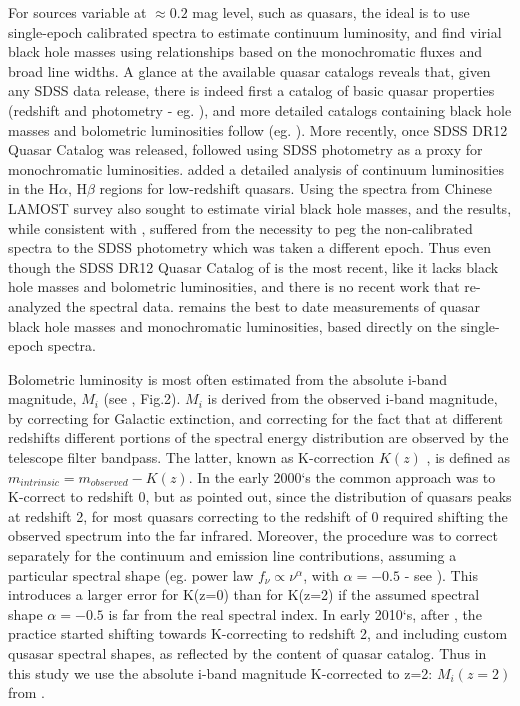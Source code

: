 \documentclass[twocolumn]{aastex62}
\begin{document}
For sources variable at $\approx0.2$ mag level, such as quasars, the ideal is to use single-epoch calibrated spectra to estimate continuum luminosity, and find virial black hole masses using relationships based on the monochromatic fluxes and broad line widths. A glance at the available quasar catalogs reveals that, given any SDSS data release, there is indeed first a catalog of basic quasar properties (redshift and photometry - eg. \citealt{schneider2007, schneider2010}), and more detailed catalogs containing black hole masses and bolometric luminosities  follow (eg. \citealt{shen2008, shen2011}). More recently, once SDSS DR12 Quasar Catalog \citep{paris2017} was released,  \citealt{kozlowski2017a} followed using SDSS photometry as a proxy for monochromatic luminosities. \citet{chen2018} added a detailed analysis of continuum luminosities in the  H$\alpha$, H$\beta$ regions for low-redshift quasars. Using the spectra from Chinese LAMOST survey \citet{dong2018} also sought to estimate virial black hole masses, and the results, while consistent with \citet{shen2011}, suffered from the necessity to peg the non-calibrated spectra to the SDSS photometry which was taken  a different epoch. Thus even though the SDSS DR12 Quasar Catalog of \cite{paris2018}  is the most recent, like \citet{paris2017} it lacks black hole masses and bolometric luminosities, and there is no recent work that re-analyzed the spectral data. \citet{shen2011} remains the best to date measurements of quasar black hole masses and monochromatic luminosities, based directly on the single-epoch spectra. 


Bolometric luminosity is most often estimated from the absolute i-band magnitude, $M_{i}$ (see \citealt{shen2008}, Fig.2). $M_{i}$ is derived from the observed i-band magnitude, by correcting for Galactic extinction, and correcting for the fact that at different redshifts different portions of the spectral energy distribution are observed by the telescope filter bandpass. The latter, known as K-correction $K(z)$ \citep{oke1968},  is defined as $m_{intrinsic} = m_{observed} - K(z)$. In the early 2000`s the common approach was to K-correct to redshift 0, but as \citep{richards2006a} pointed out, since the distribution of quasars peaks at redshift 2, for most quasars correcting to the redshift of 0 required shifting the observed spectrum into the far infrared. Moreover, the procedure was to correct separately for the continuum and emission line contributions, assuming a particular spectral shape (eg. power law  $f_{\nu} \propto \nu^{\alpha}$, with $\alpha=-0.5$ - see \citealt{schneider2010, vandenberk2001, richards2006a}).  This introduces a larger error for K(z=0) than for K(z=2) if the assumed spectral shape $\alpha=-0.5$ is far from the real spectral index. In early 2010`s, after  \citealt{richards2006a, wisotzki2000, blanton2003},  the practice started shifting towards K-correcting to redshift 2,  and including custom qusasar spectral shapes, as reflected by the content of \cite{shen2011} quasar catalog. Thus in this study we use  the absolute i-band magnitude K-corrected to z=2: $M_{i}(z=2)$ from \citep{shen2011}. 
\end{document}
